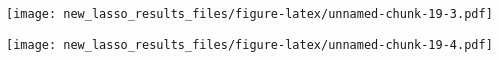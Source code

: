 \documentclass[
]{article}
\newenvironment{Shaded}{\begin{snugshade}}{\end{snugshade}}
\newcommand{\DataTypeTok}[1]{\textcolor[rgb]{0.13,0.29,0.53}{#1}}
\newcommand{\DecValTok}[1]{\textcolor[rgb]{0.00,0.00,0.81}{#1}}
\newcommand{\KeywordTok}[1]{\textcolor[rgb]{0.13,0.29,0.53}{\textbf{#1}}}
\newcommand{\NormalTok}[1]{#1}
\newcommand{\OperatorTok}[1]{\textcolor[rgb]{0.81,0.36,0.00}{\textbf{#1}}}
\newcommand{\StringTok}[1]{\textcolor[rgb]{0.31,0.60,0.02}{#1}}
\begin{document}
\texttt{[image: new\_lasso\_results\_files/figure-latex/unnamed-chunk-19-3.pdf]}

\begin{Shaded}
\end{Shaded}

\texttt{[image: new\_lasso\_results\_files/figure-latex/unnamed-chunk-19-4.pdf]}
\end{document}
